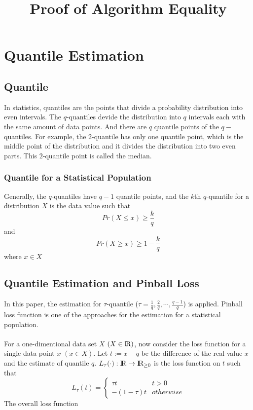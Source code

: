 \documentclass[11pt]{article}
\title{Proof of Algorithm Equality}
\begin{document}
\maketitle
            
\section{Quantile Estimation}

\subsection{Quantile}

In statistics, quantiles are the points that divide a probability distribution into even intervals.
The $q$-quantiles devide the distribution into $q$ intervals each with the same amount of data points.
And there are $q$ quantile points of the $q-$quantiles.
For example, the $2$-quantile has only one quantile point, which is the middle point of the distribution
and it divides the distribution into two even parts. This $2$-quantile point is called the median.


\subsubsection{Quantile for a Statistical Population}
Generally, the $q$-quantiles have $q-1$ quantile points, and the $k$th $q$-quantile for a 
distribution $X$ is the data value such that
$$
Pr(X \leq x) \geq \frac{k}{q}
$$
and
$$
Pr(X \geq x) \geq 1 - \frac{k}{q}
$$
where $x \in X$

\subsection{Quantile Estimation and Pinball Loss}
In this paper, the estimation for $\tau$-quantile 
($\tau =  \frac{1}{q}, \frac{2}{q}, \cdots, \frac{q-1}{q}$)
is applied.
Pinball loss function is one of the approaches for the estimation for a statistical population.
\\\\
For a one-dimentional data set $X$ $(X \in \rm I\!R)$, 
now consider the loss function for a single data point $x$ $(x \in X)$.
Let $t := x - q$ be the difference of the real value $x$ and the estimate of quantile $q$.
$L_{\tau}(\cdot): \rm I\!R \to \rm I\!R_{\geq 0}$ is the loss function on $t$ such that
$$
L_\tau(t)= 
    \begin{cases}
        \tau t & t > 0\\
        -(1-\tau) t & otherwise
    \end{cases}
$$
The overall loss function
\end{document}
